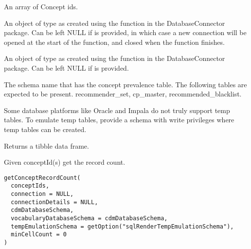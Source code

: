 \documentclass[a4paper]{book}
\begin{document}
%
\begin{Arguments}
\begin{ldescription}
\item[\code{conceptIds}] An array of Concept ids.

\item[\code{connection}] An object of type  as created using the
 function in the
DatabaseConnector package. Can be left NULL if 
is provided, in which case a new connection will be opened at the start
of the function, and closed when the function finishes.

\item[\code{connectionDetails}] An object of type  as created using the
 function in the
DatabaseConnector package. Can be left NULL if  is
provided.

\item[\code{conceptPrevalenceSchema}] The schema name that has the concept prevalence table. The following
tables are expected to be present. recommender\_set,
cp\_master, recommended\_blacklist.

\item[\code{tempEmulationSchema}] Some database platforms like Oracle and Impala do not truly support temp tables. To emulate temp 
tables, provide a schema with write privileges where temp tables can be created.
\end{ldescription}
\end{Arguments}
%
\begin{Value}
Returns a tibble data frame.
\end{Value}
%
\begin{Description}\relax
Given conceptId(s) get the record count.
\end{Description}
%
\begin{Usage}
\begin{verbatim}
getConceptRecordCount(
  conceptIds,
  connection = NULL,
  connectionDetails = NULL,
  cdmDatabaseSchema,
  vocabularyDatabaseSchema = cdmDatabaseSchema,
  tempEmulationSchema = getOption("sqlRenderTempEmulationSchema"),
  minCellCount = 0
)
\end{verbatim}
\end{Usage}
%
\end{document}
